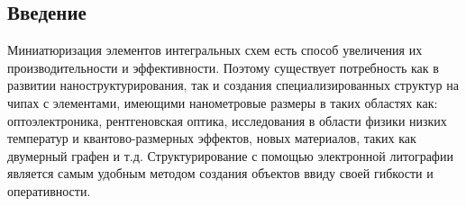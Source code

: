 
\begin{titlepage}

\chapter*{Введение}

Миниатюризация элементов интегральных схем есть способ увеличения их
производительности и эффективности. Поэтому существует потребность как
в развитии наноструктурирования, так и создания специализированных
структур на чипах с элементами, имеющими нанометровые размеры в таких
областях как: оптоэлектроника, рентгеновская оптика, исследования в
области физики низких температур и квантово-размерных эффектов, новых
материалов, таких как двумерный графен и т.д.
Структурирование с помощью электронной литографии является самым
удобным методом создания объектов ввиду своей гибкости и оперативности.


\end{titlepage}
 
